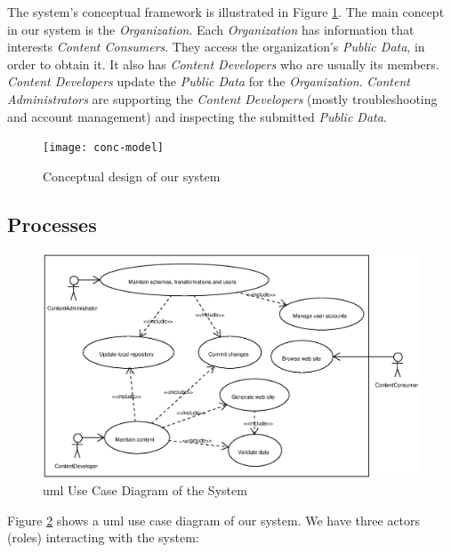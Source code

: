 \documentclass{elsart}
\begin{document}
The system's conceptual framework is illustrated in Figure \ref{fig:conc-model}.
The main concept in our system is the {\em Organization}. Each {\em Organization} has 
information that interests {\em Content Consumers}. They 
access the organization's {\em Public Data}, in order to obtain it.
It also has {\em Content Developers} 
who are usually its members. {\em Content Developers} update the 
{\em Public Data} for the {\em Organization}. {\em Content Administrators} 
are supporting the {\em Content Developers} 
(mostly troubleshooting and account management)
and inspecting the submitted {\em Public Data}.

\begin{figure}[h!]
\begin{center}
\texttt{[image: conc-model]}
\end{center}
\caption{Conceptual design of our system}
\label{fig:conc-model}
\end{figure}

\subsection{Processes}

\begin{figure}[h!]
\includegraphics[scale=0.5]{use-case-diagram}
\caption{{\sc uml} Use Case Diagram of the System}
\label{fig:use-case-diagram}
\end{figure}

Figure \ref{fig:use-case-diagram} shows a {\sc uml} \cite{UML} use case diagram of our system. 
We have three actors (roles) interacting with the system:
\end{document}
